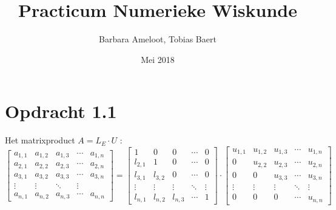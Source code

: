 \documentclass[a4paper]{article}
\title{Practicum Numerieke Wiskunde}
\author{Barbara Ameloot, Tobias Baert}
\date{Mei 2018}
\begin{document}
\maketitle
%
%
%
%
%
%
   \section*{Opdracht 1.1}
Het matrixproduct  $A=L_{E}\cdot U$ :
\\
\[
 \begin{bmatrix}
  a_{1,1} & a_{1,2}&a_{1,3} & \cdots & a_{1,n} \\
  a_{2,1} & a_{2,2}&a_{2,3} & \cdots & a_{2,n} \\
  a_{3,1} & a_{3,2}&a_{3,3} & \cdots & a_{3,n} \\
  \vdots  & \vdots  & \ddots & \vdots  \\
  a_{n,1} & a_{n,2} & a_{n,3} & \cdots & a_{n,n} 
 \end{bmatrix}
=
\begin{bmatrix}
 1 & 0 & 0& \cdots & 0 \\
  l_{2,1} &1 &0& \cdots &0 \\
  l_{3,1} &l_{3,2} &0& \cdots &0 \\
    \vdots  &\vdots  & \vdots  & \ddots & \vdots  \\
  l_{n,1} &l_{n,2}&l_{n,3} & \cdots & 1 
\end{bmatrix}
\cdot
\begin{bmatrix}
  u_{1,1} & u_{1,2}&u_{1,3}& \cdots & u_{1,n} \\
  0 & u_{2,2}&u_{2,3} & \cdots & u_{2,n} \\
  0 & 0&u_{3,3} & \cdots & u_{3,n} \\
   \vdots  & \vdots  & \vdots  & \ddots & \vdots  \\
 0 & 0 &0& \cdots & u_{n,n}
\end{bmatrix}
\]
\\
\end{document}
